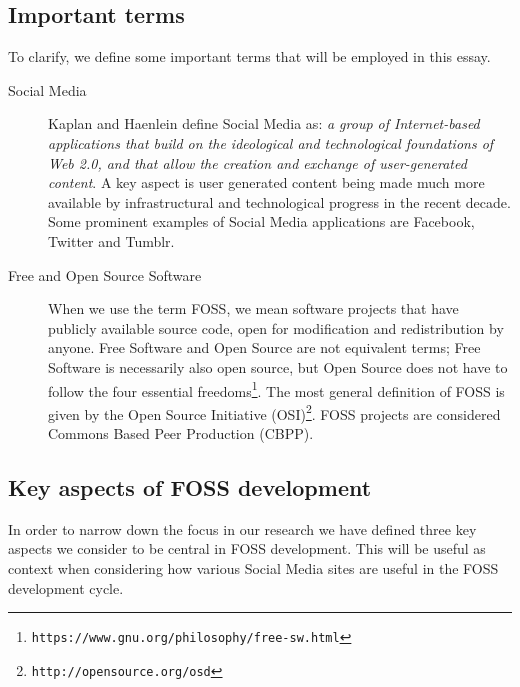 \documentclass[a4paper,11pt]{article} %
\begin{document}

\subsection{Important terms}

To clarify, we define some important terms that will be employed in this essay.

\begin{description}
\item[Social Media] \hfill
  
  Kaplan and Haenlein define Social Media as: \textit{a group of
    Internet-based applications that build on the ideological and
    technological foundations of Web 2.0, and that allow the creation
    and exchange of user-generated content}\cite{Kaplan201059}. A key
  aspect is user generated content being made much more available by
  infrastructural and technological progress in the recent
  decade. Some prominent examples of Social Media applications are
  Facebook, Twitter and Tumblr.

\item[Free and Open Source Software] \hfill

  When we use the term FOSS, we mean software projects that have publicly
  available source code, open for modification and redistribution by
  anyone\cite[p.~18, p.~57]{leister2014opensource}. Free Software and Open
  Source are not equivalent terms; Free Software is necessarily also open
  source, but Open Source does not have to follow the four essential
  freedoms\footnote{\texttt{https://www.gnu.org/philosophy/free-sw.html}}. The
  most general definition of FOSS is given by the Open Source Initiative
  (OSI)\footnote{\texttt{http://opensource.org/osd}}. FOSS projects
  are considered Commons Based Peer Production (CBPP).

\end{description}

\subsection{Key aspects of FOSS development}

In order to narrow down the focus in our research we have defined three key aspects
we consider to be central in FOSS development. This will be useful as context
when considering how various Social Media sites are useful in the FOSS development cycle.
\end{document}
